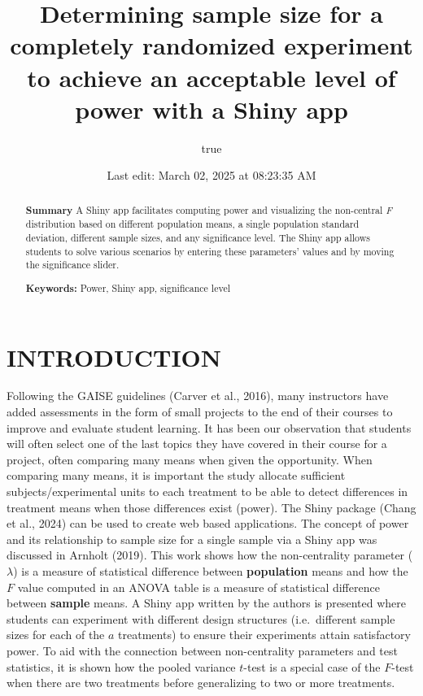 \documentclass[
]{article}
\title{Determining sample size for a completely randomized experiment to achieve an acceptable level of power with a Shiny app}
\author{true}
\date{Last edit: March 02, 2025 at 08:23:35 AM}
\begin{document}
\maketitle
\begin{abstract}
\textbf{Summary} A Shiny app facilitates computing power and visualizing the non-central \emph{F} distribution based on different population means, a single population standard deviation, different sample sizes, and any significance level. The Shiny app allows students to solve various scenarios by entering these parameters' values and by moving the significance slider.

\textbf{Keywords:} Power, Shiny app, significance level
\end{abstract}

\hypertarget{introduction}{%
\section*{INTRODUCTION}\label{introduction}}

Following the GAISE guidelines (Carver et al., 2016), many instructors have added assessments in the form of small projects to the end of their courses to improve and evaluate student learning. It has been our observation that students will often select one of the last topics they have covered in their course for a project, often comparing many means when given the opportunity. When comparing many means, it is important the study allocate sufficient subjects/experimental units to each treatment to be able to detect differences in treatment means when those differences exist (power). The Shiny package (Chang et al., 2024) can be used to create web based applications. The concept of power and its relationship to sample size for a single sample via a Shiny app was discussed in Arnholt (2019). This work shows how the non-centrality parameter (\(\lambda\)) is a measure of statistical difference between \textbf{population} means and how the \(F\) value computed in an ANOVA table is a measure of statistical difference between \textbf{sample} means. A Shiny app written by the authors is presented where students can experiment with different design structures (i.e.~different sample sizes for each of the \(a\) treatments) to ensure their experiments attain satisfactory power. To aid with the connection between non-centrality parameters and test statistics, it is shown how the pooled variance \(t\)-test is a special case of the \(F\)-test when there are two treatments before generalizing to two or more treatments.
\end{document}
